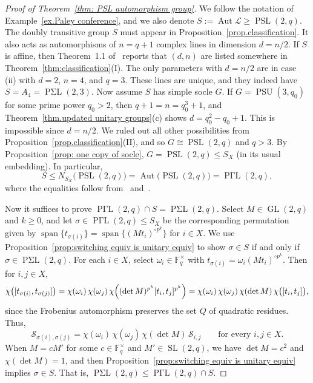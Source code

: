 \documentclass[11pt]{article}
\theoremstyle{definition}
\numberwithin{equation}{section}
\begin{document}
\begin{proof}[Proof of Theorem~\ref{thm: PSL automorphism group}]
We follow the notation of Example~\ref{ex.Paley conference}, and we also denote $S:= \operatorname{Aut} \mathscr{L} \geq \operatorname{PSL}(2,q)$.
The doubly transitive group $S$ must appear in Proposition~\ref{prop.classification}.
It also acts as automorphisms of $n = q+1$ complex lines in dimension $d = n/2$.
If $S$ is affine, then Theorem~1.1 of~\cite{DempwolffK:23} reports that $(d,n)$ are listed somewhere in Theorem~\ref{thm:classification}(I).
The only parameters with $d=n/2$ are in case (ii) with $d=2$, $n=4$, and $q=3$.
These lines are unique, and they indeed have $S = A_4 = \operatorname{P\text{$\Sigma$}L}(2,3)$.
Now assume $S$ has simple socle $G$.
If $G = \operatorname{PSU}(3,q_0)$ for some prime power $q_0 > 2$, then $q+1 = n = q_0^3 + 1$, and Theorem~\ref{thm.updated unitary groups}(c) shows $d = q_0^2 - q_0 + 1$.
This is impossible since $d = n/2$.
We ruled out all other possibilities from Proposition~\ref{prop.classification}(II), and so $G \cong \operatorname{PSL}(2,q)$ and $q > 3$.
By Proposition~\ref{prop: one copy of socle}, $G = \operatorname{PSL}(2,q) \leq S_X$ (in its usual embedding).
In particular,
\[
S \leq N_{S_X}\bigl( \operatorname{PSL}(2,q) \bigr) = \operatorname{Aut}\bigl( \operatorname{PSL}(2,q) \bigr) = \operatorname{P\text{$\Gamma$}L}(2,q),
\]
where the equalities follow from~\cite[Theorem~4.2A]{DixonMortimer:96} and~\cite[\S 3.3.4]{Wilson:09}.


Now it suffices to prove $\operatorname{P\text{$\Gamma$}L}(2,q) \cap S = \operatorname{P\text{$\Sigma$}L}(2,q)$.
Select $M \in \operatorname{GL}(2,q)$ and $k \geq 0$, and let $\sigma \in \operatorname{P\text{$\Gamma$}L}(2,q) \leq S_X$ be the corresponding permutation given by $\operatorname{span}\{ t_{\sigma(i)} \} = \operatorname{span}\{ (M t_i)^{\circ p^k} \}$ for $i \in X$.
We use Proposition~\ref{prop:switching equiv is unitary equiv} to show $\sigma \in S$ if and only if $\sigma \in \operatorname{P\text{$\Sigma$}L}(2,q)$.
For each $i \in X$, select $\omega_i \in \mathbb{F}_q^\times$ with $t_{\sigma(i)} = \omega_i (M t_i)^{\circ p^k}$.
Then for $i, j \in X$,
\[
\chi\bigl( [t_{\sigma(i)}, t_{\sigma(j)} ] \bigr) 
= \chi(\omega_i) \, \chi(\omega_j) \, \chi\Bigl( (\det M)^{p^k} [t_i, t_j]^{p^k} \Bigr)
= \chi(\omega_i) \, \chi(\omega_j) \, \chi( \det M) \, \chi\bigl( [t_i, t_j] \bigr),
\]
since the Frobenius automorphism preserves the set $Q$ of quadratic residues.
Thus,
\begin{equation}
\label{eq: PSL auto 1}
\mathcal{S}_{\sigma(i),\sigma(j)} = \chi(\omega_i) \, \chi(\omega_j) \, \chi( \det M) \, \mathcal{S}_{i,j}
\qquad
\text{for every $i,j \in X$.}
\end{equation}
When $M = c M'$ for some $c \in \mathbb{F}_q^\times$ and $M' \in \operatorname{SL}(2,q)$, we have $\det M = c^2$ and $\chi( \det M) = 1$, and then Proposition~\ref{prop:switching equiv is unitary equiv} implies $\sigma \in S$.
That is, $\operatorname{P\text{$\Sigma$}L}(2,q) \leq \operatorname{P\text{$\Gamma$}L}(2,q) \cap S$.


\end{proof}
\end{document}
